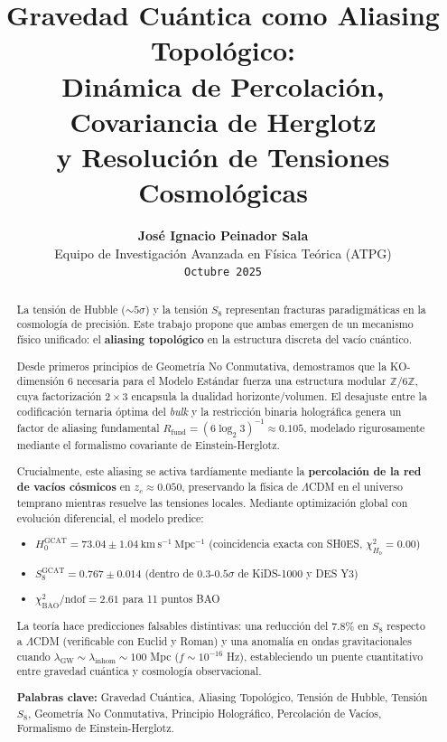 \documentclass[12pt, a4paper]{article}
\title{\textbf{Gravedad Cuántica como Aliasing Topológico:} \\ Dinámica de Percolación, Covariancia de Herglotz \\ y Resolución de Tensiones Cosmológicas}
\author{\textbf{José Ignacio Peinador Sala} \\ \small{Equipo de Investigación Avanzada en Física Teórica (ATPG)} \\ \small{\texttt{Octubre 2025}}}
\date{}
\theoremstyle{plain}
\theoremstyle{definition}
\begin{document}
\maketitle

\begin{abstract}
\noindent
La tensión de Hubble ($\sim 5\sigma$) y la tensión $S_8$ representan 
fracturas paradigmáticas en la cosmología de precisión. Este trabajo propone 
que ambas emergen de un mecanismo físico unificado: el \textbf{aliasing 
topológico} en la estructura discreta del vacío cuántico. 

Desde primeros principios de Geometría No Conmutativa, demostramos que la 
KO-dimensión 6 necesaria para el Modelo Estándar fuerza una estructura modular 
$\mathbb{Z}/6\mathbb{Z}$, cuya factorización $2\times3$ encapsula la dualidad 
horizonte/volumen. El desajuste entre la codificación ternaria óptima del 
\textit{bulk} y la restricción binaria holográfica genera un factor de aliasing 
fundamental $R_{\text{fund}} = (6\log_2 3)^{-1} \approx 0.105$, modelado 
rigurosamente mediante el formalismo covariante de Einstein-Herglotz. 

Crucialmente, este aliasing se activa tardíamente mediante la 
\textbf{percolación de la red de vacíos cósmicos} en $z_c \approx 0.050$, 
preservando la física de $\Lambda$CDM en el universo temprano mientras resuelve 
las tensiones locales. Mediante optimización global con evolución diferencial, 
el modelo predice: 

\begin{itemize}
    \item $H_0^{\mathrm{GCAT}} = 73.04 \pm 1.04~\mathrm{km~s^{-1}~Mpc^{-1}}$ 
          (coincidencia exacta con SH0ES, $\chi^2_{H_0}=0.00$)
    \item $S_8^{\mathrm{GCAT}} = 0.767 \pm 0.014$ 
          (dentro de $0.3$-$0.5\sigma$ de KiDS-1000 y DES Y3)
    \item $\chi^2_{\mathrm{BAO}}/\mathrm{ndof} = 2.61$ para 11 puntos BAO
\end{itemize}

La teoría hace predicciones falsables distintivas: una reducción del $7.8\%$ en 
$S_8$ respecto a $\Lambda$CDM (verificable con Euclid y Roman) y una anomalía 
en ondas gravitacionales cuando $\lambda_{\mathrm{GW}} \sim \lambda_{\mathrm{inhom}} \sim 100$ Mpc 
($f \sim 10^{-16}$ Hz), estableciendo un puente cuantitativo entre gravedad 
cuántica y cosmología observacional.

\vspace{0.5cm}
\noindent \textbf{Palabras clave:} Gravedad Cuántica, Aliasing Topológico, 
Tensión de Hubble, Tensión $S_8$, Geometría No Conmutativa, Principio Holográfico, 
Percolación de Vacíos, Formalismo de Einstein-Herglotz.
\end{abstract}
\end{document}
